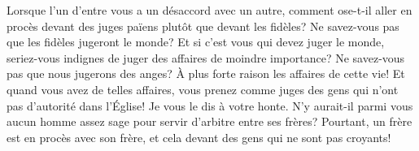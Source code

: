 Lorsque l’un d’entre vous a un désaccord avec un autre,
	comment ose-t-il aller en procès devant des juges païens
	plutôt que devant les fidèles?
	Ne savez-vous pas que les fidèles jugeront le monde?
Et si c’est vous qui devez juger le monde,
	seriez-vous indignes de juger des affaires de moindre importance?
	Ne savez-vous pas que nous jugerons des anges?
	À plus forte raison les affaires de cette vie!
Et quand vous avez de telles affaires,
	vous prenez comme juges des gens qui n’ont pas d’autorité dans l’Église!
Je vous le dis à votre honte.
	N’y aurait-il parmi vous aucun homme assez sage
	pour servir d’arbitre entre ses frères?
Pourtant, un frère est en procès avec son frère,
	et cela devant des gens qui ne sont pas croyants!
